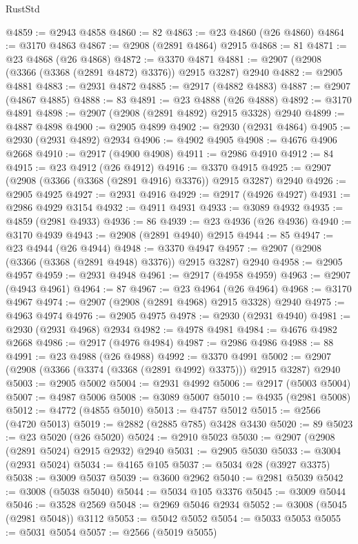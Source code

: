 \begin{lexlean}{RustStd}
\begin{coremodule}
@4859 := @2943 @4858
@4860 := 82
@4863 := @23 @4860 (@26 @4860)
@4864 := @3170 @4863
@4867 := @2908 (@2891 @4864) @2915
@4868 := 81
@4871 := @23 @4868 (@26 @4868)
@4872 := @3370 @4871
@4881 := @2907 (@2908 (@3366 (@3368 (@2891 @4872) @3376)) @2915 @3287) @2940
@4882 := @2905 @4881
@4883 := @2931 @4872
@4885 := @2917 (@4882 @4883)
@4887 := @2907 (@4867 @4885)
@4888 := 83
@4891 := @23 @4888 (@26 @4888)
@4892 := @3170 @4891
@4898 := @2907 (@2908 (@2891 @4892) @2915 @3328) @2940
@4899 := @4887 @4898
@4900 := @2905 @4899
@4902 := @2930 (@2931 @4864)
@4905 := @2930 (@2931 @4892) @2934
@4906 := @4902 @4905
@4908 := @4676 @4906 @2668
@4910 := @2917 (@4900 @4908)
@4911 := @2986 @4910
@4912 := 84
@4915 := @23 @4912 (@26 @4912)
@4916 := @3370 @4915
@4925 := @2907 (@2908 (@3366 (@3368 (@2891 @4916) @3376)) @2915 @3287) @2940
@4926 := @2905 @4925
@4927 := @2931 @4916
@4929 := @2917 (@4926 @4927)
@4931 := @2986 @4929 @3154
@4932 := @4911 @4931
@4933 := @3089 @4932
@4935 := @4859 (@2981 @4933)
@4936 := 86
@4939 := @23 @4936 (@26 @4936)
@4940 := @3170 @4939
@4943 := @2908 (@2891 @4940) @2915
@4944 := 85
@4947 := @23 @4944 (@26 @4944)
@4948 := @3370 @4947
@4957 := @2907 (@2908 (@3366 (@3368 (@2891 @4948) @3376)) @2915 @3287) @2940
@4958 := @2905 @4957
@4959 := @2931 @4948
@4961 := @2917 (@4958 @4959)
@4963 := @2907 (@4943 @4961)
@4964 := 87
@4967 := @23 @4964 (@26 @4964)
@4968 := @3170 @4967
@4974 := @2907 (@2908 (@2891 @4968) @2915 @3328) @2940
@4975 := @4963 @4974
@4976 := @2905 @4975
@4978 := @2930 (@2931 @4940)
@4981 := @2930 (@2931 @4968) @2934
@4982 := @4978 @4981
@4984 := @4676 @4982 @2668
@4986 := @2917 (@4976 @4984)
@4987 := @2986 @4986
@4988 := 88
@4991 := @23 @4988 (@26 @4988)
@4992 := @3370 @4991
@5002 := @2907 (@2908 (@3366 (@3374 (@3368 (@2891 @4992) @3375))) @2915 @3287) @2940
@5003 := @2905 @5002
@5004 := @2931 @4992
@5006 := @2917 (@5003 @5004)
@5007 := @4987 @5006
@5008 := @3089 @5007
@5010 := @4935 (@2981 @5008)
@5012 := @4772 (@4855 @5010)
@5013 := @4757 @5012
@5015 := @2566 (@4720 @5013)
@5019 := @2882 (@2885 @785) @3428 @3430
@5020 := 89
@5023 := @23 @5020 (@26 @5020)
@5024 := @2910 @5023
@5030 := @2907 (@2908 (@2891 @5024) @2915 @2932) @2940
@5031 := @2905 @5030
@5033 := @3004 (@2931 @5024)
@5034 := @4165 @105
@5037 := @5034 @28 (@3927 @3375)
@5038 := @3009 @5037
@5039 := @3600 @2962
@5040 := @2981 @5039
@5042 := @3008 (@5038 @5040)
@5044 := @5034 @105 @3376
@5045 := @3009 @5044
@5046 := @3528 @2569
@5048 := @2969 @5046 @2934
@5052 := @3008 (@5045 (@2981 @5048)) @3112
@5053 := @5042 @5052
@5054 := @5033 @5053
@5055 := @5031 @5054
@5057 := @2566 (@5019 @5055)

\end{coremodule}
\end{lexlean}
